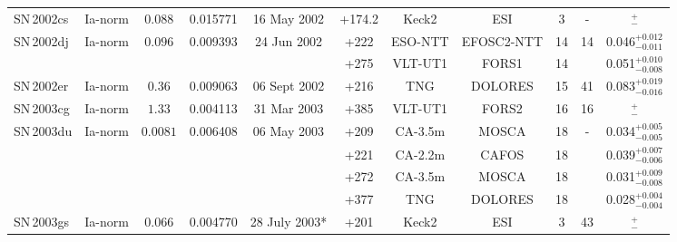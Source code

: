 \documentclass[fleqn,usenatbib]{mnras}
\begin{document}
\begin{table}
{\begin{tabular}{l c c cccccccc}
    SN\,2002cs & Ia-norm   & $0.088$  & 0.015771 & 16 May 2002  & +174.2 & Keck2    & ESI           & 3 &-& $^{+}_{-}$ \\
    SN\,2002dj & Ia-norm   & $0.096$  & 0.009393 & 24 Jun 2002  & +222   & ESO-NTT  & EFOSC2-NTT    & 14& 14 & 0.046$^{+0.012}_{-0.011}$ \\
             &           &          &          &              & +275   & VLT-UT1  & FORS1         & 14&    & 0.051$^{+0.010}_{-0.008}$ \\
    SN\,2002er & Ia-norm   & $0.36$   & 0.009063 & 06 Sept 2002 & +216   & TNG      & DOLORES       & 15& 41 & 0.083$^{+0.019}_{-0.016}$ \\ 
    SN\,2003cg & Ia-norm   & $1.33$   & 0.004113 & 31 Mar 2003  & +385   & VLT-UT1  & FORS2         & 16& 16 & $^{+}_{-}$ \\
    SN\,2003du & Ia-norm   & $0.0081$ & 0.006408 & 06 May 2003  & +209   & CA-3.5m  & MOSCA         & 18&-& 0.034$^{+0.005}_{-0.005}$ \\
             &           &          &          &              & +221   & CA-2.2m  & CAFOS         & 18& & 0.039$^{+0.007}_{-0.006}$ \\
             &           &          &          &              & +272   & CA-3.5m  & MOSCA         & 18& & 0.031$^{+0.009}_{-0.008}$ \\
             &           &          &          &              & +377   & TNG      & DOLORES       & 18& & 0.028$^{+0.004}_{-0.004}$ \\
    SN\,2003gs & Ia-norm   & $0.066$  & 0.004770 & 28 July 2003*& +201   & Keck2    & ESI           & 3 & 43 & $^{+}_{-}$ \\

\end{tabular}}
\end{table}
\end{document}
